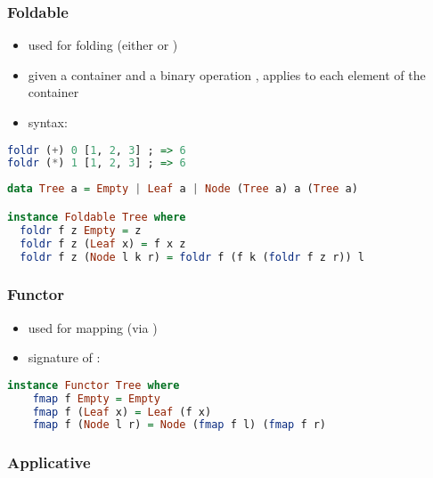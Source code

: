 \documentclass[a4paper,landscape,10pt]{article}
\begin{document}
\begin{multicols*}{2}
  \subsubsection{Foldable}

  \begin{itemize}
    \item used for folding (either  or )
    \item given a container and a binary operation , applies  to each element of the container
    \item syntax: 
  \end{itemize}

  \begin{lstlisting}[language=Haskell]
foldr (+) 0 [1, 2, 3] ; => 6
foldr (*) 1 [1, 2, 3] ; => 6
\end{lstlisting}

  \begin{lstlisting}[language=Haskell]
data Tree a = Empty | Leaf a | Node (Tree a) a (Tree a)

instance Foldable Tree where
  foldr f z Empty = z
  foldr f z (Leaf x) = f x z
  foldr f z (Node l k r) = foldr f (f k (foldr f z r)) l
\end{lstlisting}

  \subsubsection{Functor}

  \begin{itemize}
    \item used for mapping (via )
    \item signature of : 
  \end{itemize}

  \begin{lstlisting}[language=Haskell]
instance Functor Tree where
    fmap f Empty = Empty
    fmap f (Leaf x) = Leaf (f x)
    fmap f (Node l r) = Node (fmap f l) (fmap f r)
\end{lstlisting}

  \breakcolumn

  \subsubsection{Applicative}


\end{multicols*}
\end{document}
